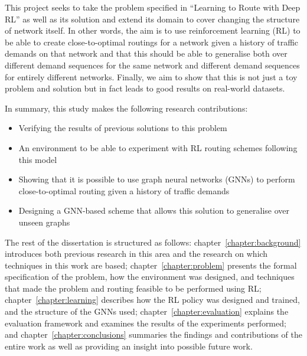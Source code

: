 This project seeks to take the problem specified in ``Learning to Route with Deep RL'' as well as its solution and extend its domain to cover changing the structure of network itself. In other words, the aim is to use reinforcement learning (RL) to be able to create close-to-optimal routings for a network given a history of traffic demands on that network and that this should be able to generalise both over different demand sequences for the same network and different demand sequences for entirely different networks. Finally, we aim to show that this is not just a toy problem and solution but in fact leads to good results on real-world datasets.

In summary, this study makes the following research contributions:
\begin{itemize}
  \item Verifying the results of previous solutions to this problem
  \item An environment to be able to experiment with RL routing schemes following this model
  \item Showing that it is possible to use graph neural networks (GNNs) to perform close-to-optimal routing given a history of traffic demands
  \item Designing a GNN-based scheme that allows this solution to generalise over unseen graphs
\end{itemize}

The rest of the dissertation is structured as follows: chapter~\ref{chapter:background} introduces both previous research in this area and the research on which techniques in this work are based; chapter~\ref{chapter:problem} presents the formal specification of the problem, how the environment was designed, and techniques that made the problem and routing feasible to be performed using RL; chapter~\ref{chapter:learning} describes how the RL policy was designed and trained, and the structure of the GNNs used; chapter~\ref{chapter:evaluation} explains the evaluation framework and examines the results of the experiments performed; and chapter~\ref{chapter:conclusions} summaries the findings and contributions of the entire work as well as providing an insight into possible future work.
